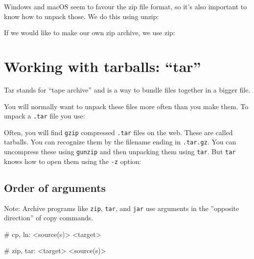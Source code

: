 Windows and macOS seem to favour the zip file format, so it's also important to
know how to unpack those. We do this using unzip:

\begin{prompt}
\end{prompt}

If we would like to make our own zip archive, we use zip:

\begin{prompt}
\end{prompt}

\section{Working with tarballs: ``tar''}

Tar stands for ``tape archive'' and is a way to bundle files together in a bigger
file.

You will normally want to unpack these files more often than you make them. To
unpack a \lstinline|.tar| file you use:

\begin{prompt}
\end{prompt}

Often, you will find \lstinline|gzip| compressed \lstinline|.tar| files on the web. These are called
tarballs. You can recognize them by the filename ending in \lstinline|.tar.gz|.
 You can uncompress these using \lstinline|gunzip| and then unpacking them using
\lstinline|tar|. But \lstinline|tar| knows how to open them using the \lstinline|-z| option:

\begin{prompt}
\end{prompt}

\subsection{Order of arguments}

Note: Archive programs like \lstinline|zip|, \lstinline|tar|, and \lstinline|jar| use arguments in the
''opposite direction'' of copy commands.

\begin{prompt}
    # cp, ln: <source(s)> <target>

    # zip, tar: <target> <source(s)>
\end{prompt}

